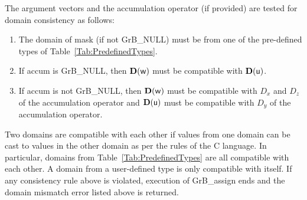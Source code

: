 The argument vectors and the accumulation 
operator (if provided) are tested for domain consistency as follows:
\begin{enumerate}
	\item The domain of {\sf mask} (if not {\sf GrB\_NULL}) must be from one of 
    the pre-defined types of Table~\ref{Tab:PredefinedTypes}.

	\item If {\sf accum} is {\sf GrB\_NULL}, then $\bold{D}({\sf w})$ must be 
    compatible with $\bold{D}({\sf u})$.

	\item If {\sf accum} is not {\sf GrB\_NULL}, then $\bold{D}({\sf w})$ must be
    compatible with $D_x$ and $D_z$ of the accumulation operator and 
    $\bold{D}({\sf u})$ must be compatible with $D_y$ of the accumulation operator.
\end{enumerate}
Two domains are compatible with each other if values from one domain can be cast 
to values in the other domain as per the rules of the C language.
In particular, domains from Table~\ref{Tab:PredefinedTypes} are all compatible 
with each other. A domain from a user-defined type is only compatible with itself.
If any consistency rule above is violated, execution of {\sf GrB\_assign} ends
and the domain mismatch error listed above is returned.

